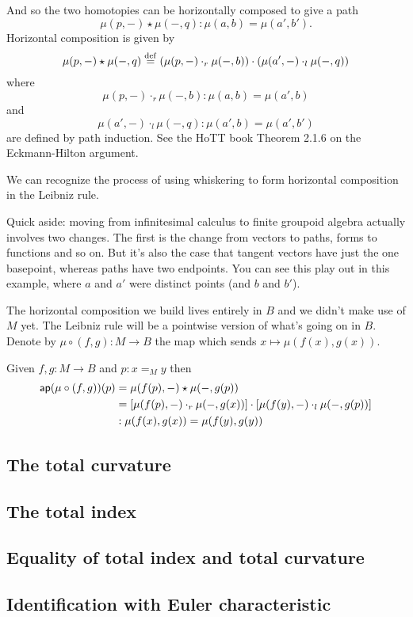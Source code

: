And so the two homotopies can be horizontally composed to give a path \[ \mu(p,-)\star\mu(-,q): \mu(a, b)=\mu(a',b'). \] Horizontal composition is given by \[\mu(p,-)\star\mu(-,q)\stackrel{\mathrm{def}}{=}(\mu(p,-)\cdot_r \mu(-,b))\cdot(\mu(a', -)\cdot_l\mu(-, q))\] where \[ \mu(p,-)\cdot_r\mu(-,b):\mu(a,b)=\mu(a',b) \] and \[ \mu(a',-)\cdot_l\mu(-,q):\mu(a',b)=\mu(a',b') \] are defined by path induction.  See the HoTT book Theorem 2.1.6 on the Eckmann-Hilton argument\cite{hottbook}.

We can recognize the process of using whiskering to form horizontal composition in the Leibniz rule. 

Quick aside: moving from infinitesimal calculus to finite groupoid algebra actually involves two changes. The first is the change from vectors to paths, forms to functions and so on. But it's also the case that tangent vectors have just the one basepoint, whereas paths have two endpoints. You can see this play out in this example, where \( a \) and \( a' \) were distinct points (and \( b \) and \( b' \)).

The horizontal composition we build lives entirely in \( B \) and we didn't make use of \( M \) yet. The Leibniz rule will be a pointwise version of what's going on in \( B \). Denote by \( \mu\circ(f,g):M\to B \) the map which sends \( x\mapsto \mu(f(x),g(x)) \).

\begin{mylemma}
Given \( f, g:M\to B \) and \( p:x=_M y \) then 
\begin{align*}
 \mathsf{ap}(\mu\circ(f,g))(p)&=\mu(f(p),-)\star\mu(-,g(p))\\
 &=\left[\mu(f(p),-)\cdot_r \mu(-,g(x))\right]\cdot \left[\mu(f(y),-)\cdot_l\mu(-,g(p))\right]\\
 &:\mu(f(x),g(x))=\mu(f(y),g(y))
\end{align*}
\end{mylemma}

\subsection{The total curvature}


\subsection{The total index}

\subsection{Equality of total index and total curvature}

\subsection{Identification with Euler characteristic}


